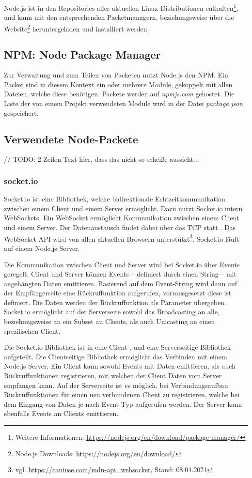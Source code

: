 Node.js ist in den Repositories aller aktuellen Linux-Distributionen enthalten\footnote{Weitere Informationen: \url{https://nodejs.org/en/download/package-manager/}}, und kann mit den entsprechenden Packetmanagern, beziehungsweise über die Website\footnote{Node.js Downloads: \url{https://nodejs.org/en/download/}} heruntergeladen und installiert werden.\par

\subsection{NPM: Node Package Manager}
Zur Verwaltung und zum Teilen von Packeten nutzt Node.js den \ac{NPM}. Ein Packet sind in diesem Kontext ein oder mehrere Module, gekoppelt mit allen Dateien, welche diese benötigen. Packete werden auf \textit{npmjs.com} gehostet. Die Liste der von einem Projekt verwendeten Module wird in der Datei \textit{package.json} gespeichert.

\subsection{Verwendete Node-Packete}
// TODO: 2 Zeilen Text hier, dass das nicht so scheiße aussieht...

\subsubsection{socket.io}
Socket.io ist eine Bibliothek, welche bidirektionale Echtzeitkommunikation zwischen einem Client und einem Server ermöglicht. Dazu nutzt Socket.io intern WebSockets\cite{socketio}. Ein WebSocket ermöglicht Kommunikation zwischen einem Client und einem Server. Der Datenaustausch findet dabei über das \ac{TCP} statt \cite{websocketRFC}. Das WebSocket \ac{API} wird von allen aktuellen Browsern unterstützt\footnote{vgl. \url{https://caniuse.com/mdn-api_websocket}, Stand: 08.04.2021}. Socket.io läuft auf einem Node.js Server\cite{socketio}.\par

Die Kommunikation zwischen Client und Server wird bei Socket.io über Events geregelt. Client und Server können Events -- definiert durch einen String -- mit angehängten Daten emittieren. Basierend auf dem Event-String wird dann auf der Empfängerseite eine Rückruffunktion aufgerufen, vorrausgesetzt diese ist definiert. Die Daten werden der Rückruffunktion als Parameter übergeben. Socket.io ermöglicht auf der Serverseite sowohl das Broadcasting an alle, beziehungsweise an ein Subset an Clients, als auch Unicasting an einen spezifischen Client.\par

Die Socket.io Bibliothek ist in eine Client-, und eine Serverseitige Bibliothek aufgeteilt. Die Clientseitige Bibliothek ermöglicht das Verbinden mit einem Node.js Server. Ein Client kann sowohl Events mit Daten emittieren, als auch Rückruffunktionen registrieren, mit welchen der Client Daten vom Server empfangen kann. Auf der Serverseite ist es möglich, bei Verbindungsaufbau Rückruffunktionen für einen neu verbundenen Client zu registrieren, welche bei dem Eingang von Daten je nach Event-Typ aufgerufen werden. Der Server kann ebenfalls Events an Clients emittieren.
